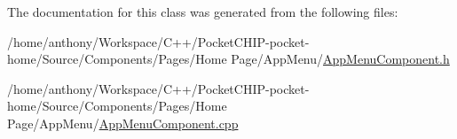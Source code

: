 The documentation for this class was generated from the following files\+:\begin{DoxyCompactItemize}
\item 
/home/anthony/\+Workspace/\+C++/\+Pocket\+C\+H\+I\+P-\/pocket-\/home/\+Source/\+Components/\+Pages/\+Home Page/\+App\+Menu/\mbox{\hyperlink{AppMenuComponent_8h}{App\+Menu\+Component.\+h}}\item 
/home/anthony/\+Workspace/\+C++/\+Pocket\+C\+H\+I\+P-\/pocket-\/home/\+Source/\+Components/\+Pages/\+Home Page/\+App\+Menu/\mbox{\hyperlink{AppMenuComponent_8cpp}{App\+Menu\+Component.\+cpp}}\end{DoxyCompactItemize}
